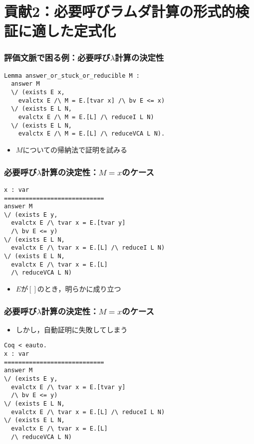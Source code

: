 \documentclass[dvipdfmx,cjk,xcolor=dvipsnames,envcountsect,notheorems,12pt]{beamer}
\theoremstyle{definition}
\begin{document}
\section{貢献2：必要呼びラムダ計算の形式的検証に適した定式化}

\begin{frame}[fragile]
	\frametitle{評価文脈で困る例：必要呼び$\lambda$計算の決定性}
\begin{lstlisting}
Lemma answer_or_stuck_or_reducible M :
  answer M
  \/ (exists E x,
    evalctx E /\ M = E.[tvar x] /\ bv E <= x)
  \/ (exists E L N,
    evalctx E /\ M = E.[L] /\ reduceI L N)
  \/ (exists E L N,
    evalctx E /\ M = E.[L] /\ reduceVCA L N).
\end{lstlisting}
	\begin{itemize}
		\item $M$についての帰納法で証明を試みる
	\end{itemize}
\end{frame}

\begin{frame}[fragile]
	\frametitle{必要呼び$\lambda$計算の決定性：$M=x$のケース}
\begin{lstlisting}
x : var
============================
answer M
\/ (exists E y,
  evalctx E /\ tvar x = E.[tvar y]
  /\ bv E <= y)
\/ (exists E L N,
  evalctx E /\ tvar x = E.[L] /\ reduceI L N)
\/ (exists E L N,
  evalctx E /\ tvar x = E.[L]
  /\ reduceVCA L N)
\end{lstlisting}
	\begin{itemize}
		\item $E$が$[]$のとき，明らかに成り立つ
	\end{itemize}
\end{frame}

\begin{frame}[fragile]
	\frametitle{必要呼び$\lambda$計算の決定性：$M=x$のケース}
	\begin{itemize}
		\item しかし，自動証明に失敗してしまう
	\end{itemize}
\begin{lstlisting}
Coq < eauto.
x : var
============================
answer M
\/ (exists E y,
  evalctx E /\ tvar x = E.[tvar y]
  /\ bv E <= y)
\/ (exists E L N,
  evalctx E /\ tvar x = E.[L] /\ reduceI L N)
\/ (exists E L N,
  evalctx E /\ tvar x = E.[L]
  /\ reduceVCA L N)
\end{lstlisting}
\end{frame}
\end{document}
